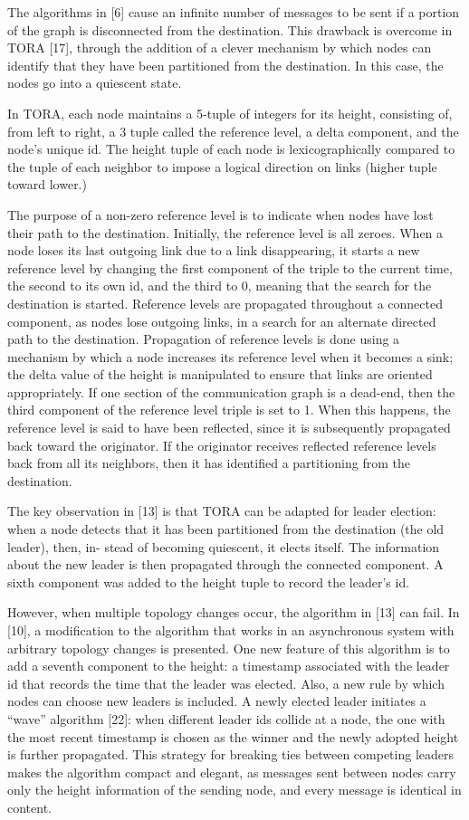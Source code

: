 The algorithms in [6] cause an infinite number of messages to be sent if a portion of the graph is disconnected from the destination. This drawback is overcome in TORA [17], through the addition of a clever mechanism by which nodes can identify that they have been partitioned from the destination. In this case, the nodes go into a quiescent state.

In TORA, each node maintains a 5-tuple of integers for its height, consisting of, from left to right, a 3 tuple called the reference level, a delta component, and the node’s unique id. The height tuple of each node is lexicographically compared to the tuple of each neighbor to impose a logical direction on links (higher tuple toward lower.)

The purpose of a non-zero reference level is to indicate when nodes have lost their path to the destination. Initially, the reference level is all zeroes. When a node loses its last outgoing link due to a link disappearing, it starts a new reference level by changing the first component of the triple to the current time, the second to its own id, and the third to 0, meaning that the search for the destination is started. Reference levels are propagated throughout a connected component, as nodes lose outgoing links, in a search for an alternate directed path to the destination. Propagation of reference levels is done using a mechanism by which a node increases its reference level when it becomes a sink; the delta value of the height is manipulated to ensure that links are oriented appropriately. If one section of the communication graph is a dead-end, then the third component of the reference level triple is set to 1. When this happens, the reference level is said to have been reflected, since it is subsequently propagated back toward the originator. If the originator receives reflected reference levels back from all its neighbors, then it has identified a partitioning from the destination.

The key observation in [13] is that TORA can be adapted for leader election: when a node detects that it has been partitioned from the destination (the old leader), then, in- stead of becoming quiescent, it elects itself. The information about the new leader is then propagated through the connected component. A sixth component was added to the height tuple to record the leader’s id.

However, when multiple topology changes occur, the algorithm in [13] can fail. In [10], a modification to the algorithm that works in an asynchronous system with arbitrary topology changes is presented. One new feature of this algorithm is to add a seventh component to the height: a timestamp associated with the leader id that records the time that the leader was elected. Also, a new rule by which nodes can choose new leaders is included. A newly elected leader initiates a “wave” algorithm [22]: when different leader ids collide at a node, the one with the most recent timestamp is chosen as the winner and the newly adopted height is further propagated. This strategy for breaking ties between competing leaders makes the algorithm compact and elegant, as messages sent between nodes carry only the height information of the sending node, and every message is identical in content.

